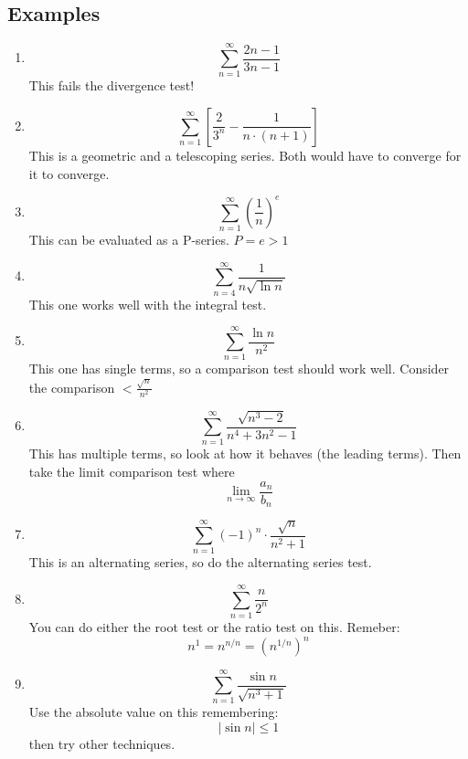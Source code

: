 \documentclass{report}
\begin{document}
    \subsection{Examples}
        \begin{enumerate}
            \item \[\sum_{n = 1}^{\infty} \frac{2n-1}{3n-1} \]
            This fails the divergence test!
            \item \[\sum_{n = 1}^{\infty} \left[ \frac{2}{3^n} - \frac{1}{n \cdot (n+1)} \right]\]
            This is a geometric and a telescoping series. Both would have to converge for it to converge.
            \item \[\sum_{n = 1}^{\infty} \left(\frac{1}{n}\right)^e \]
            This can be evaluated as a P-series. \(P = e > 1\)
            \item \[\sum_{n = 4}^{\infty} \frac{1}{n \sqrt{\ln n}} \]
            This one works well with the integral test.
            \item \[\sum_{n = 1}^{\infty} \frac{\ln n}{n^2} \]
            This one has single terms, so a comparison test should work well.
            Consider the comparison \(< \frac{\sqrt{n}}{n^2}\)
            \item \[\sum_{n = 1}^{\infty} \frac{\sqrt{n^3 - 2}}{n^4+3n^2-1} \]
            This has multiple terms, so look at how it behaves (the leading terms).
            Then take the limit comparison test where \[\lim_{n \to \infty} \frac{a_n}{b_n}\]
            \item \[\sum_{n = 1}^{\infty} (-1)^n \cdot \frac{\sqrt{n}}{n^2 + 1} \]
            This is an alternating series, so do the alternating series test.
            \item \[\sum_{n = 1}^{\infty} \frac{n}{2^n} \]
            You can do either the root test or the ratio test on this.
            Remeber: \[n^1 = n^{n/n} = \left(n^{1/n}\right)^n\]
            \item \[\sum_{n = 1}^{\infty} \frac{\sin n}{\sqrt{n^3 + 1}} \]
            Use the absolute value on this remembering: \[|\sin n| \leq 1\] then try other techniques.
        \end{enumerate}
\end{document}

